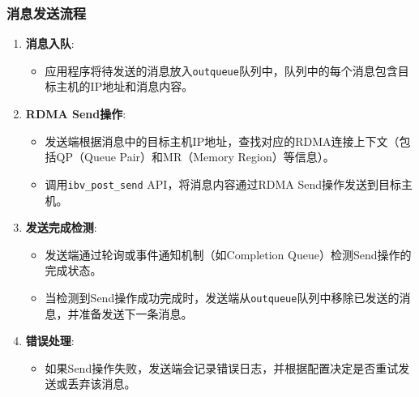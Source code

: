{    \subsubsection{消息发送流程}
    \begin{enumerate}[leftmargin=1em, align=left]
        \item \textbf{消息入队}:
              \begin{itemize}[leftmargin=*, nosep]
                  \item 应用程序将待发送的消息放入\texttt{outqueue}队列中，队列中的每个消息包含目标主机的IP地址和消息内容。
              \end{itemize}
        \item \textbf{RDMA Send操作}:
              \begin{itemize}[leftmargin=*, nosep]
                  \item 发送端根据消息中的目标主机IP地址，查找对应的RDMA连接上下文（包括QP（Queue Pair）和MR（Memory Region）等信息）。
                  \item 调用\texttt{ibv\_post\_send} API，将消息内容通过RDMA Send操作发送到目标主机。
              \end{itemize}
        \item \textbf{发送完成检测}:
              \begin{itemize}[leftmargin=*, nosep]
                  \item 发送端通过轮询或事件通知机制（如Completion Queue）检测Send操作的完成状态。
                  \item 当检测到Send操作成功完成时，发送端从\texttt{outqueue}队列中移除已发送的消息，并准备发送下一条消息。
              \end{itemize}
        \item \textbf{错误处理}:
              \begin{itemize}[leftmargin=*, nosep]
                  \item 如果Send操作失败，发送端会记录错误日志，并根据配置决定是否重试发送或丢弃该消息。
              \end{itemize}
    \end{enumerate}

}
